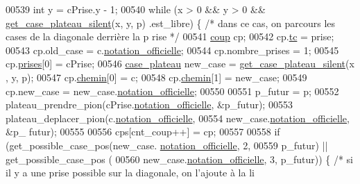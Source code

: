 \begin{DoxyCode}
00539                         \textcolor{keywordtype}{int} y = cPrise.y - 1;
00540                         \textcolor{keywordflow}{while} (x > 0 && y > 0 && \hyperlink{plateau_8h_a60a8f706865d0ae9087f8d65d4667655}{get_case_plateau_silent}(x, y, p)
      .est\_libre) \{ \textcolor{comment}{/* dans ce cas, on parcours les cases de la diagonale derrière la p
      rise */}
00541                                 \hyperlink{structcoup}{coup} cp;
00542                                 cp.\hyperlink{structcoup_aa33da004dccb192cb33bc00c26c6e859}{tc} = prise;
00543                                 cp.old\_case = c.\hyperlink{structcase__plateau_ad510581b324604a9cf685cbb769a421a}{notation_officielle};
00544                                 cp.nombre\_prises = 1;
00545                                 cp.\hyperlink{structcoup_ae19b3a66d3f4e66b8f69a38e4005f44a}{prises}[0] = cPrise;
00546                                 \hyperlink{structcase__plateau}{case_plateau} new\_case = \hyperlink{plateau_8h_a60a8f706865d0ae9087f8d65d4667655}{get_case_plateau_silent}(x
      , y, p);
00547                                 cp.\hyperlink{structcoup_aa66b88eb8140c2f459ac92fad0796510}{chemin}[0] = c;
00548                                 cp.\hyperlink{structcoup_aa66b88eb8140c2f459ac92fad0796510}{chemin}[1] = new\_case;
00549                                 cp.new\_case = new\_case.\hyperlink{structcase__plateau_ad510581b324604a9cf685cbb769a421a}{notation_officielle};
00550 
00551                                 p\_futur = p;
00552                                 plateau\_prendre\_pion(cPrise.\hyperlink{structcase__plateau_ad510581b324604a9cf685cbb769a421a}{notation_officielle}, 
      &p\_futur);
00553                                 plateau\_deplacer\_pion(c.\hyperlink{structcase__plateau_ad510581b324604a9cf685cbb769a421a}{notation_officielle},
00554                                                 new\_case.\hyperlink{structcase__plateau_ad510581b324604a9cf685cbb769a421a}{notation_officielle}, &p\_
      futur);
00555 
00556                                 cps[cnt\_coup++] = cp;
00557 
00558                                 \textcolor{keywordflow}{if} (get\_possible\_case\_pos(new\_case.
      \hyperlink{structcase__plateau_ad510581b324604a9cf685cbb769a421a}{notation_officielle}, 2,
00559                                                 p\_futur) || get\_possible\_case\_pos
      (
00560                                                 new\_case.\hyperlink{structcase__plateau_ad510581b324604a9cf685cbb769a421a}{notation_officielle}, 3, 
      p\_futur)) \{ \textcolor{comment}{/* si il y a une prise possible sur la diagonale, on l'ajoute à la li
}
\end{DoxyCode}
